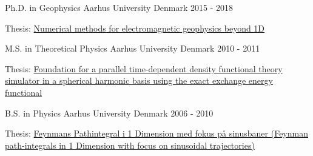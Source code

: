 

\begin{cventries}

  \cventry
    {Ph.D. in Geophysics} %
    {Aarhus University} %
    {Denmark} %
    {2015 - 2018} %
    {
      \begin{cvitems} %
        \item {Thesis: \href{https://www.forskningsdatabasen.dk/en/catalog/2392633187}{Numerical methods for electromagnetic geophysics beyond 1D}}
      \end{cvitems}
    }

  \cventry
    {M.S. in Theoretical Physics} %
    {Aarhus University} %
    {Denmark} %
    {2010 - 2011} %
    {
      \begin{cvitems} %
        \item {Thesis: \href{https://phys.au.dk/fileadmin/site_files/forskning/ltc/theses/thesistue.pdf}{Foundation for a parallel time-dependent density functional theory simulator in a spherical harmonic basis using the exact exchange energy functional}}
      \end{cvitems}
    }

  \cventry
    {B.S. in Physics} %
    {Aarhus University} %
    {Denmark} %
    {2006 - 2010} %
    {
      \begin{cvitems} %
        \item {Thesis: \href{https://users-phys.au.dk/~fedorov/subatom/bachelor/tue-feynman-path.pdf}{Feynmans Pathintegral i 1 Dimension med fokus på sinusbaner (Feynman path-integrals in 1 Dimension with focus on sinusoidal trajectories)}}
      \end{cvitems}
    }

\end{cventries}
